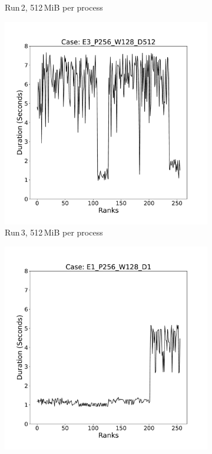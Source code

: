 \begin{figure}
\begin{subfigure}[b]{0.3\textwidth}
         \caption{Run\,2, 512\,MiB per process}
         \label{fig:E2_512}
     \end{subfigure}
      \hfill
     \begin{subfigure}[b]{0.3\textwidth}
         \centering
         \includegraphics[width=\textwidth, height=\textwidth]{figures/E3_P256_W128_D512.pdf}
         \caption{Run\,3, 512\,MiB per process}
         \label{fig:E3_512}
     \end{subfigure}
     \vfill
          \begin{subfigure}[b]{0.3\textwidth}
         \centering
         \includegraphics[width=\textwidth, height=\textwidth]{figures/E1_P256_W128_D1.pdf}

\end{subfigure}
\end{figure}
